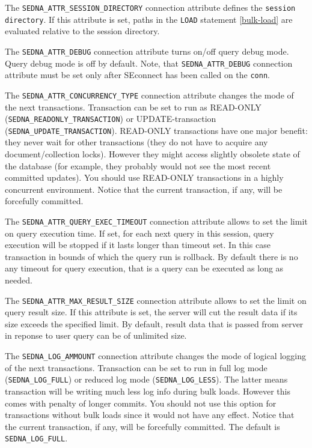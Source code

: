 \documentclass[a4paper,12pt]{article}
\begin{document}
The \verb!SEDNA_ATTR_SESSION_DIRECTORY! connection attribute defines the \verb!session directory!. If this attribute is set, paths in the \verb!LOAD! statement \ref{bulk-load} are evaluated relative to the session directory.

The \verb!SEDNA_ATTR_DEBUG! connection attribute turns on/off query debug mode. Query debug mode is off by default. Note, that \verb!SEDNA_ATTR_DEBUG! connection attribute must be set only after SEconnect has been called on the \verb!conn!.

The \verb!SEDNA_ATTR_CONCURRENCY_TYPE! connection attribute changes the mode of the next transactions. Transaction can be set to run as READ-ONLY (\verb!SEDNA_READONLY_TRANSACTION!) or UPDATE-transaction (\verb!SEDNA_UPDATE_TRANSACTION!).
READ-ONLY transactions have one major benefit: they never wait for other transactions (they do not have to acquire
any document/collection locks). However they might access slightly obsolete state of the database (for example, they probably
would not see the most recent committed updates). You should use READ-ONLY transactions in a highly concurrent environment.
Notice that the current transaction, if any, will be forcefully committed.

The \verb!SEDNA_ATTR_QUERY_EXEC_TIMEOUT! connection attribute allows to set the limit on query execution time. If set, for each next query in this session, query execution will be stopped if it lasts longer than timeout set. In this case transaction in bounds of which the query run is rollback. By default there is no any timeout for query execution, that is a query can be executed as long as needed.

The \verb!SEDNA_ATTR_MAX_RESULT_SIZE! connection attribute allows to set the limit on query result size. If this attribute is set, the server will cut the result data if its size exceeds the specified limit. By default, result data that is passed from server in reponse to user query can be of unlimited size.

The \verb!SEDNA_LOG_AMMOUNT! connection attribute changes the mode of logical logging of the next transactions.
Transaction can be set to run in full log mode (\verb!SEDNA_LOG_FULL!) or reduced log mode (\verb!SEDNA_LOG_LESS!). The latter
means transaction will be writing much less log info during bulk loads. However this comes with penalty of longer commits.
You should not use this option for transactions without bulk loads since it would not have any effect.
Notice that the current transaction, if any, will be forcefully committed. The default is \verb!SEDNA_LOG_FULL!.
\end{document}
